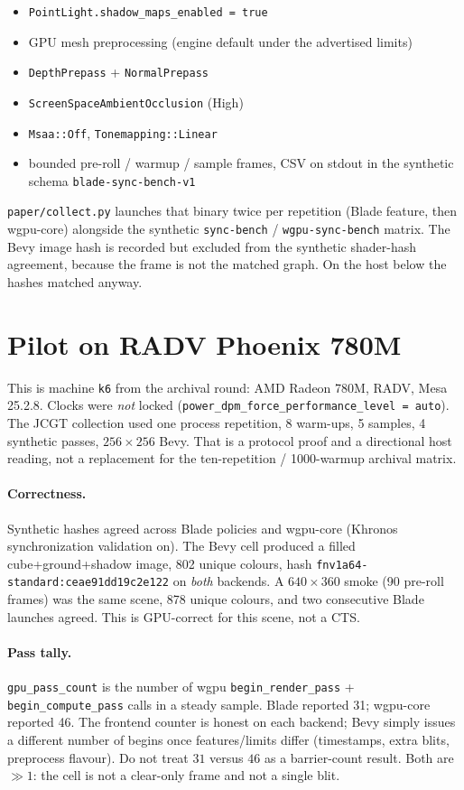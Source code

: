 \documentclass[10pt,twocolumn]{article}
\begin{document}
\begin{itemize}
  \item \texttt{PointLight.shadow\_maps\_enabled = true}
  \item GPU mesh preprocessing (engine default under the advertised
        limits)
  \item \texttt{DepthPrepass} + \texttt{NormalPrepass}
  \item \texttt{ScreenSpaceAmbientOcclusion} (High)
  \item \texttt{Msaa::Off}, \texttt{Tonemapping::Linear}
  \item bounded pre-roll / warmup / sample frames, CSV on stdout in the
        synthetic schema \texttt{blade-sync-bench-v1}
\end{itemize}

\texttt{paper/collect.py} launches that binary twice per repetition
(Blade feature, then wgpu-core) alongside the synthetic
\texttt{sync-bench} / \texttt{wgpu-sync-bench} matrix. The Bevy image
hash is recorded but excluded from the synthetic shader-hash agreement,
because the frame is not the matched graph. On the host below the hashes
matched anyway.

\section{Pilot on RADV Phoenix 780M}

This is machine \texttt{k6} from the archival round: AMD Radeon 780M,
RADV, Mesa 25.2.8. Clocks were \emph{not} locked
(\texttt{power\_dpm\_force\_performance\_level = auto}). The JCGT
collection used one process repetition, 8 warm-ups, 5 samples, 4
synthetic passes, $256\times256$ Bevy. That is a protocol proof and a
directional host reading, not a replacement for the ten-repetition /
1000-warmup archival matrix.

\paragraph{Correctness.}
Synthetic hashes agreed across Blade policies and wgpu-core (Khronos
synchronization validation on). The Bevy cell produced a filled
cube+ground+shadow image, 802 unique colours, hash
\texttt{fnv1a64-standard:ceae91dd19c2e122} on \emph{both} backends. A
$640\times360$ smoke (90 pre-roll frames) was the same scene, 878 unique
colours, and two consecutive Blade launches agreed. This is GPU-correct
for this scene, not a CTS.

\paragraph{Pass tally.}
\texttt{gpu\_pass\_count} is the number of wgpu
\texttt{begin\_render\_pass} + \texttt{begin\_compute\_pass} calls in a
steady sample. Blade reported 31; wgpu-core reported 46. The frontend
counter is honest on each backend; Bevy simply issues a different number
of begins once features/limits differ (timestamps, extra blits,
preprocess flavour). Do not treat $31$ versus $46$ as a barrier-count
result. Both are $\gg 1$: the cell is not a clear-only frame and not a
single blit.
\end{document}
